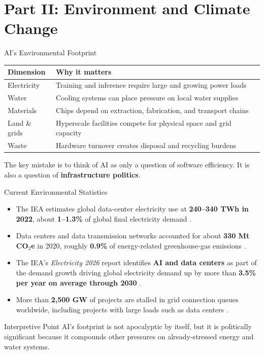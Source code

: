 \documentclass[aspectratio=169,11pt]{beamer}
\begin{document}
\section{Part II: Environment and Climate Change}

\begin{frame}{AI's Environmental Footprint}
\begin{table}[h]
\centering
\scriptsize
\begin{tabular}{@{}p{3.2cm}p{8.8cm}@{}}
\toprule
\textbf{Dimension} & \textbf{Why it matters} \\
\midrule
Electricity & Training and inference require large and growing power loads \\
\addlinespace
Water & Cooling systems can place pressure on local water supplies \\
\addlinespace
Materials & Chips depend on extraction, fabrication, and transport chains \\
\addlinespace
Land \& grids & Hyperscale facilities compete for physical space and grid capacity \\
\addlinespace
Waste & Hardware turnover creates disposal and recycling burdens \\
\bottomrule
\end{tabular}
\end{table}

\vspace{0.2cm}
The key mistake is to think of AI as only a question of software efficiency. It is also a question of \textbf{infrastructure politics}.
\end{frame}

\begin{frame}{Current Environmental Statistics}
\begin{itemize}
    \item The IEA estimates global data-center electricity use at \textbf{240--340 TWh in 2022}, about \textbf{1--1.3\%} of global final electricity demand \parencite{iea_data_centres_2023}.
    \item Data centers and data transmission networks accounted for about \textbf{330 Mt CO$_2$e} in 2020, roughly \textbf{0.9\%} of energy-related greenhouse-gas emissions \parencite{iea_data_centres_2023}.
    \item The IEA's \textit{Electricity 2026} report identifies \textbf{AI and data centers} as part of the demand growth driving global electricity demand up by more than \textbf{3.5\% per year on average through 2030} \parencite{iea_electricity_2026}.
    \item More than \textbf{2,500 GW} of projects are stalled in grid connection queues worldwide, including projects with large loads such as data centers \parencite{iea_electricity_2026}.
\end{itemize}

\begin{alertblock}{Interpretive Point}
AI's footprint is not apocalyptic by itself, but it is politically significant because it compounds other pressures on already-stressed energy and water systems.
\end{alertblock}
\end{frame}
\end{document}
